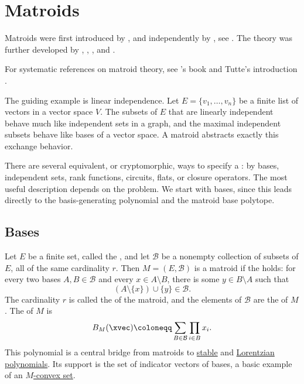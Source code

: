 



\section[matroid]{Matroids}

Matroids were first introduced by  \cite{Whitney1935},
and independently by , see \cite{NishimuraKuroda2009}.
The theory was further developed by ,
,
, and .

For systematic references on matroid theory, see
's book \cite{Oxley2011} and Tutte's
introduction \cite{Tutte1971}.


The guiding example is linear independence.  Let
$E=\{v_1,\dotsc,v_n\}$ be a finite list of vectors in a vector space $V$.
The subsets of $E$ that are linearly independent behave much like independent
sets in a graph, and the maximal independent subsets behave like bases of a
vector space.  A matroid abstracts exactly this exchange behavior.

There are several equivalent, or cryptomorphic, ways to specify a
\label{matroidDefinition}: by bases, independent sets, rank
functions, circuits, flats, or closure operators.  The most useful description
depends on the problem.  We start with bases, since this leads directly to the
basis-generating polynomial and the matroid base polytope.


\subsection[matroidBases]{Bases}

Let $E$ be a finite set, called the \label{groundSet}, and let
$\mathcal{B}$ be a nonempty collection of subsets of $E$, all of the same
cardinality $r$.  Then $M=(E,\mathcal{B})$ is a matroid if the
\label{basisExchangeAxiom} holds: for every two bases
$A,B\in\mathcal{B}$ and every $x\in A\setminus B$, there is some
$y\in B\setminus A$ such that
\[
  (A\setminus \{x\})\cup \{y\} \in \mathcal{B}.
\]
The cardinality $r$ is called the \label{matroidRankDefinition}
of the matroid, and the elements of $\mathcal{B}$ are the
\label{matroidBasis} of $M$.
The \label{basisGeneratingPolynomial} of
$M$ is
\[
  B_M(\xvec)\coloneqq \sum_{B\in\mathcal{B}} \prod_{i\in B} x_i.
\]
This polynomial is a central bridge from matroids to
\hyperref[stablePolynomial]{stable} and
\hyperref[lorentzianPolynomial]{Lorentzian polynomials}.
Its support is the set of indicator vectors of bases, a basic example of an
\hyperref[MConvexity]{$M$-convex set}.


